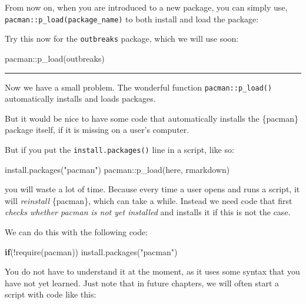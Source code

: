 \documentclass[
  letterpaper,
  DIV=11,
  numbers=noendperiod]{scrreprt}
\newenvironment{Shaded}{\begin{snugshade}}{\end{snugshade}}
\newcommand{\ControlFlowTok}[1]{\textcolor[rgb]{0.00,0.23,0.31}{\textbf{#1}}}
\newcommand{\FunctionTok}[1]{\textcolor[rgb]{0.28,0.35,0.67}{#1}}
\newcommand{\NormalTok}[1]{\textcolor[rgb]{0.00,0.23,0.31}{#1}}
\newcommand{\SpecialCharTok}[1]{\textcolor[rgb]{0.37,0.37,0.37}{#1}}
\newcommand{\StringTok}[1]{\textcolor[rgb]{0.13,0.47,0.30}{#1}}
\begin{document}
From now on, when you are introduced to a new package, you can simply
use, \texttt{pacman::p\_load(package\_name)} to both install and load
the package:

Try this now for the \texttt{outbreaks} package, which we will use soon:

\begin{Shaded}
\begin{Highlighting}[]
\NormalTok{pacman}\SpecialCharTok{::}\FunctionTok{p\_load}\NormalTok{(outbreaks)}
\end{Highlighting}
\end{Shaded}

\begin{center}\rule{0.5\linewidth}{0.5pt}\end{center}

Now we have a small problem. The wonderful function
\texttt{pacman::p\_load()} automatically installs and loads packages.

But it would be nice to have some code that automatically installs the
\{pacman\} package itself, if it is missing on a user's computer.

But if you put the \texttt{install.packages()} line in a script, like
so:

\begin{Shaded}
\begin{Highlighting}[]
\FunctionTok{install.packages}\NormalTok{(}\StringTok{"pacman"}\NormalTok{)}
\NormalTok{pacman}\SpecialCharTok{::}\FunctionTok{p\_load}\NormalTok{(here, rmarkdown)}
\end{Highlighting}
\end{Shaded}

you will waste a lot of time. Because every time a user opens and runs a
script, it will \emph{reinstall} \{pacman\}, which can take a while.
Instead we need code that first \emph{checks whether pacman is not yet
installed} and installs it if this is not the case.

We can do this with the following code:

\begin{Shaded}
\begin{Highlighting}[]
\ControlFlowTok{if}\NormalTok{(}\SpecialCharTok{!}\FunctionTok{require}\NormalTok{(pacman)) }\FunctionTok{install.packages}\NormalTok{(}\StringTok{"pacman"}\NormalTok{)}
\end{Highlighting}
\end{Shaded}

You do not have to understand it at the moment, as it uses some syntax
that you have not yet learned. Just note that in future chapters, we
will often start a script with code like this:
\end{document}
